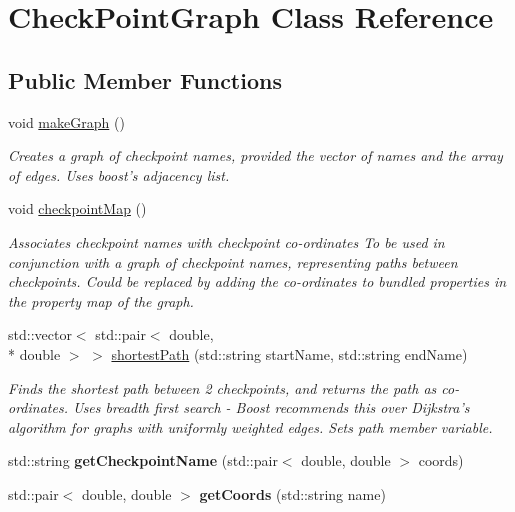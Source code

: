 \hypertarget{classCheckPointGraph}{\section{Check\-Point\-Graph Class Reference}
\label{classCheckPointGraph}
}
\subsection*{Public Member Functions}
\begin{DoxyCompactItemize}
\item 
\hypertarget{classCheckPointGraph_a417bcd9db81360b38575569f3900b0c0}{void \hyperlink{classCheckPointGraph_a417bcd9db81360b38575569f3900b0c0}{make\-Graph} ()}\label{classCheckPointGraph_a417bcd9db81360b38575569f3900b0c0}

\begin{DoxyCompactList}\small\item\em Creates a graph of checkpoint names, provided the vector of names and the array of edges. Uses boost's adjacency list. \end{DoxyCompactList}\item 
\hypertarget{classCheckPointGraph_a07e2e7cf2afa95d82076f87600761728}{void \hyperlink{classCheckPointGraph_a07e2e7cf2afa95d82076f87600761728}{checkpoint\-Map} ()}\label{classCheckPointGraph_a07e2e7cf2afa95d82076f87600761728}

\begin{DoxyCompactList}\small\item\em Associates checkpoint names with checkpoint co-\/ordinates To be used in conjunction with a graph of checkpoint names, representing paths between checkpoints. Could be replaced by adding the co-\/ordinates to bundled properties in the property map of the graph. \end{DoxyCompactList}\item 
std\-::vector$<$ std\-::pair$<$ double, \\*
double $>$ $>$ \hyperlink{classCheckPointGraph_ab48dfe7feccab1d732901b83a0ec4612}{shortest\-Path} (std\-::string start\-Name, std\-::string end\-Name)
\begin{DoxyCompactList}\small\item\em Finds the shortest path between 2 checkpoints, and returns the path as co-\/ordinates. Uses breadth first search -\/ Boost recommends this over Dijkstra's algorithm for graphs with uniformly weighted edges. Sets path member variable. \end{DoxyCompactList}\item 
\hypertarget{classCheckPointGraph_a92da1b78dfbf86627397265c43143100}{std\-::string {\bfseries get\-Checkpoint\-Name} (std\-::pair$<$ double, double $>$ coords)}\label{classCheckPointGraph_a92da1b78dfbf86627397265c43143100}

\item 
\hypertarget{classCheckPointGraph_a2200216c4d24426b2b479b3a8bb7141d}{std\-::pair$<$ double, double $>$ {\bfseries get\-Coords} (std\-::string name)}\label{classCheckPointGraph_a2200216c4d24426b2b479b3a8bb7141d}

\end{DoxyCompactItemize}


